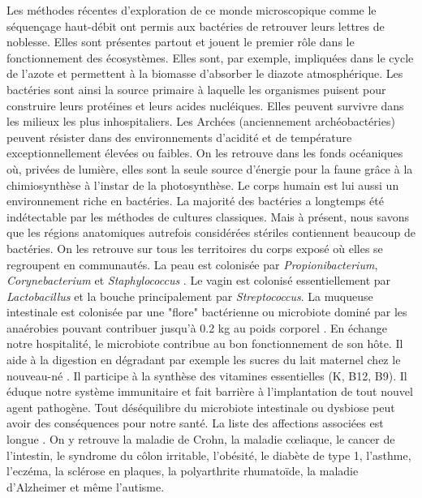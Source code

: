 \documentclass[12pt,a4paper]{article}
\begin{document}
Les méthodes récentes d'exploration de ce monde microscopique comme le séquençage haut-débit ont permis aux bactéries de retrouver leurs lettres de noblesse.
Elles sont présentes partout et jouent le premier rôle dans le fonctionnement des écosystèmes. Elles sont, par exemple, impliquées dans le cycle de l'azote et permettent à la biomasse d'absorber le diazote atmosphérique. Les bactéries sont ainsi la source primaire à laquelle les organismes puisent pour construire leurs protéines et leurs acides nucléiques.
Elles peuvent survivre dans les milieux les plus inhospitaliers. Les Archées (anciennement archéobactéries) peuvent résister dans des environnements d'acidité et de température exceptionnellement élevées ou faibles. On les retrouve dans les fonds océaniques où, privées de lumière, elles sont la seule source d'énergie pour la faune grâce à la chimiosynthèse à l'instar de la photosynthèse. 
Le corps humain est lui aussi un environnement riche en bactéries. La majorité des bactéries a longtemps été indétectable par les méthodes de cultures classiques. Mais à présent, nous savons que les régions anatomiques autrefois considérées stériles contiennent beaucoup de bactéries. 
On les retrouve sur tous les territoires du corps exposé où elles se regroupent en communautés.
La peau est colonisée par \textit{Propionibacterium}, \textit{Corynebacterium} et \textit{Staphylococcus} \cite{Yong2017}. Le vagin est colonisé essentiellement par \textit{Lactobacillus} et la bouche principalement par \textit{Streptococcus}\cite{Yong2017}.
La muqueuse intestinale est colonisée par une "flore" bactérienne ou microbiote dominé par les anaérobies pouvant contribuer jusqu'à 0.2 kg au poids corporel \citep{Sender2016}.
En échange notre hospitalité, le microbiote contribue au bon fonctionnement de son hôte. Il aide à la digestion en dégradant par exemple les sucres du lait maternel chez le nouveau-né \cite{Bode2012,Yong2017}. Il participe à la synthèse des vitamines essentielles (K, B12, B9)\cite{LeBlanc2013,Yong2017}. Il éduque notre système immunitaire et fait barrière à l'implantation de tout nouvel agent pathogène.
Tout déséquilibre du microbiote intestinale ou dysbiose peut avoir des conséquences pour notre santé. La liste des affections associées est longue \cite{Yong2017}. On y retrouve la maladie de Crohn, la maladie cœliaque, le cancer de l’intestin, le syndrome du côlon irritable, l’obésité, le diabète de type 1, l’asthme, l’eczéma, la sclérose en plaques, la polyarthrite rhumatoïde, la maladie d’Alzheimer et même l’autisme. \\
\end{document}
